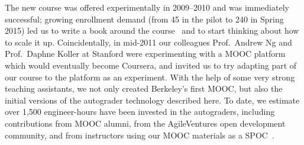 The new course was offered experimentally in 2009--2010 and was
immediately successful; growing enrollment demand (from 45 in the pilot
to 240 in Spring 2015) led 
us to write a book around the course~\cite{esaaS} and to start thinking
about how to scale it up.  
Coincidentally, in mid-2011 our colleagues Prof.~Andrew Ng
and Prof.~Daphne Koller at Stanford were experimenting with a MOOC
platform which would eventually become Coursera, and invited us to try
adapting part of our course to the
platform as an experiment.  With the help of some very strong teaching
assistants, we not only created Berkeley's first MOOC, but also the
initial versions of the autograder technology described here.  To date,
we estimate over 1,500 engineer-hours have been invested in the
autograders, including contributions from MOOC alumni,
from the AgileVentures  open development community,
and from
instructors using our MOOC materials as a SPOC~\cite{moocs-spocs-TR}.

